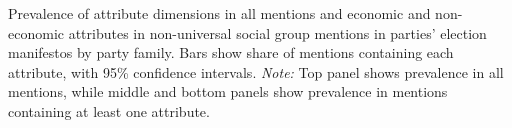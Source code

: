 Prevalence of attribute dimensions in all mentions and economic and non-economic attributes in non-universal social group mentions in parties' election manifestos by party family. Bars show share of mentions containing each attribute, with 95\% confidence intervals. \emph{Note:} Top panel shows prevalence in all mentions, while middle and bottom panels show prevalence in mentions containing at least one attribute.